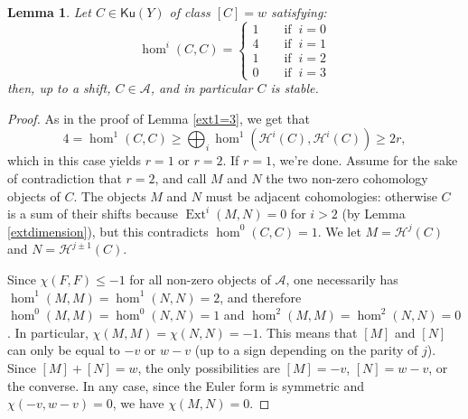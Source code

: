 \documentclass[11pt]{amsart}
\newtheorem{lemma}[thm]{Lemma}
\theoremstyle{definition}
\DeclareMathOperator{\Ext}{Ext}
\newcommand{\sA}{\mathcal{A}}
\newcommand{\Ku}{\mathsf{Ku}}
\begin{document}
\begin{lemma} \label{keylemma}
Let $C \in \Ku(Y)$ of class $[C]=w$ satisfying:
\[
\hom^i(C,C)=\begin{cases}1 \qquad \text{if }\ i=0 \\ 4 \qquad \text{if }\ i=1 \\ 1 \qquad \text{if }\ i=2 \\ 0 \qquad \text{if }\ i=3\end{cases}
\]
then, up to a shift, $C \in \mathcal{A}$, and in particular $C$ is stable.
\end{lemma}
\begin{proof}
As in the proof of Lemma \ref{ext1=3}, we get that
\[ 4=\hom^1(C,C) \geq \bigoplus_i \hom^1(\mathcal{H}^i(C), \mathcal{H}^{i}(C)) \geq 2r,\]
which in this case yields $r=1$ or $r=2$. If $r=1$, we're done. Assume for the sake of contradiction that $r=2$, and call $M$ and $N$ the two non-zero cohomology objects of $C$. The objects $M$ and $N$ must be adjacent cohomologies: otherwise $C$ is a sum of their shifts because $\Ext^{i}(M,N)=0$ for $i>2$ (by Lemma \ref{extdimension}), but this contradicts $\hom^0(C,C)=1$. We let $M= \mathcal{H}^{j}(C)$ and $N= \mathcal{H}^{j\pm 1}(C)$.

Since $\chi(F,F)\leq -1$ for all non-zero objects of $\sA$, one necessarily has $\hom^1(M,M)=\hom^1(N,N)=2$, and therefore $\hom^0(M,M)=\hom^0(N,N)=1$ and $\hom^2(M,M)=\hom^2(N,N)=0$. In particular, $\chi(M,M)=\chi(N,N)=-1$. This means that $[M]$ and $[N]$ can only be equal to $-v$ or $w-v$ (up to a sign depending on the parity of $j$). Since $[M]+[N]= w$, the only possibilities are $[M]=-v$, $[N]=w-v$, or the converse.  
In any case, since the Euler form is symmetric and $\chi(- v,w-v)=0$, we have $\chi(M,N)=0$. 


\end{proof}
\end{document}
